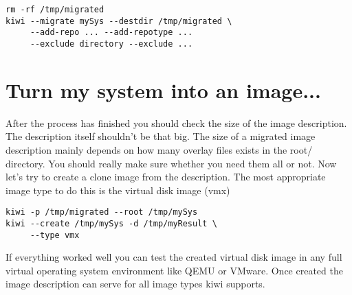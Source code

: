 \begin{Command}{12cm}
\begin{verbatim}
rm -rf /tmp/migrated
kiwi --migrate mySys --destdir /tmp/migrated \
     --add-repo ... --add-repotype ...
     --exclude directory --exclude ...
\end{verbatim}
\end{Command}

\section{Turn my system into an image...}
After the process has finished you should check the size of the
image description. The description itself shouldn't be that big.
The size of a migrated image description mainly depends on how many
overlay files exists in the root/ directory. You should really make
sure whether you need them all or not. Now let's try to create a
clone image from the description. The most appropriate image type
to do this is the virtual disk image (vmx)

\begin{Command}{12cm}
\begin{verbatim}
kiwi -p /tmp/migrated --root /tmp/mySys
kiwi --create /tmp/mySys -d /tmp/myResult \
     --type vmx
\end{verbatim}
\end{Command}

If everything worked well you can test the created virtual disk
image in any full virtual operating system environment like QEMU or
VMware. Once created the image description can serve for all image
types kiwi supports.
 
